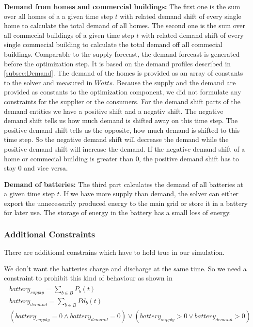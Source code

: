 \textbf{Demand from homes and commercial buildings:} The first one is the sum over all homes of a a given time step $t$ with related demand shift of every single home to calculate the total demand of all homes.
The second one is the sum over all commecial buildings of a given time step $t$ with related demand shift of every single commecial building to calculate the total demand off all commecial buildings.
Comparable to the supply forecast, the demand forecast is generated before the optimization step. 
It is based on the demand profiles described in \cref{subsec:Demand}. 
The demand of the homes is provided as an array of constants to the solver and measured in $Watts$. 
Because the supply and the demand are provided as constants to the optimization component, we did not formulate any constraints for the supplier or the consumers.
For the demand shift parts of the demand entities we have a positive shift and a negativ shift.
The negative demand shift tells us how much demand is shifted away on this time step.
The positive demand shift tells us the opposite, how much demand is shifted to this time step.
So the negative demand shift will decrease the demand while the positive demand shift will increase the demand.
If the negative demand shift of a home or commecial building is greater than 0, the positive demand shift has to stay 0 and vice versa.

\textbf{Demand of batteries:}
The third part calculates the demand of all batteries at a given time step $t$.
If we have more supply than demand, the solver can either export the unnecessarily produced energy to the main grid or store it in a battery for later use.
The storage of energy in the battery has a small loss of energy.

\subsubsection{Additional Constraints}
There are additional constrains which have to hold true in our simulation.

We don't want the batteries charge and discharge at the same time.
So we need a constraint to prohibit this kind of behaviour as shown in 
\begin{align} \label{eq:batteryConstraint}
\begin{split}
battery_{supply} = \sum\limits_{b\in B} P_{b}(t)\\
battery_{demand} = \sum\limits_{b\in B} Pd_{b}(t)\\
(battery_{supply} = 0 \wedge battery_{demand} = 0 ) \vee (battery_{supply} > 0 \veebar battery_{demand} > 0)
\end{split}
\end{align}

